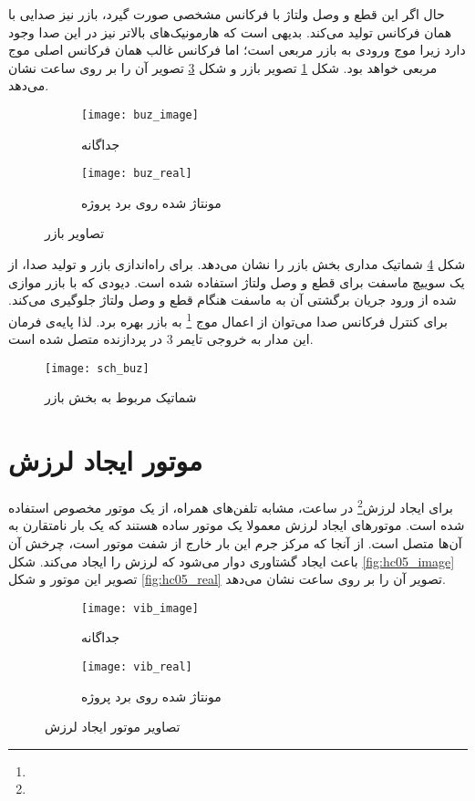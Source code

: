 حال اگر این قطع و وصل ولتاژ با فرکانس مشخصی صورت گیرد، بازر نیز صدایی با همان فرکانس تولید می‌کند. بدیهی است که هارمونیک‌های بالاتر نیز در این صدا وجود دارد زیرا موج ورودی به بازر مربعی است؛ اما فرکانس غالب همان فرکانس اصلی موج مربعی خواهد بود. شکل \ref{fig:buz_image} تصویر بازر و شکل \ref{fig:buz_real} تصویر آن را بر روی \pcbf ساعت نشان می‌دهد.

\begin{figure}[h]
	\centering
	\begin{subfigure}{0.45\textwidth}
		\centering
		\texttt{[image: buz\_image]}
		\caption{جداگانه}
		\label{fig:buz_image}
	\end{subfigure}
	\begin{subfigure}{0.4\textwidth}
		\centering
		\texttt{[image: buz\_real]}
		\caption{مونتاژ شده روی برد پروژه}
		\label{fig:buz_real}
	\end{subfigure}
	\caption{تصاویر بازر}
\end{figure}

شکل \ref{fig:sch-buz} شماتیک مداری بخش بازر را نشان می‌دهد. برای راه‌اندازی بازر و تولید صدا، از یک سوییچ ماسفت برای قطع و وصل ولتاژ استفاده شده است. دیودی که با بازر موازی شده از ورود جریان برگشتی آن به ماسفت هنگام قطع و وصل ولتاژ جلوگیری می‌کند. برای کنترل فرکانس صدا می‌توان از اعمال موج \footnote{} به بازر بهره برد. لذا پایه‌ی فرمان این مدار به خروجی  تایمر 3 در پردازنده متصل شده است.

\begin{figure}[h]
	\centering
	\texttt{[image: sch\_buz]}
	\caption{شماتیک مربوط به بخش بازر}
	\label{fig:sch-buz}
\end{figure}

\section{موتور ایجاد لرزش}
برای ایجاد لرزش\footnote{} در ساعت، مشابه تلفن‌های همراه، از یک موتور مخصوص استفاده شده است. موتورهای ایجاد لرزش معمولا یک موتور  ساده هستند که یک بار نامتقارن به آن‌ها متصل است. از آنجا که مرکز جرم این بار خارج از شفت موتور است، چرخش آن باعث ایجاد گشتاوری دوار می‌شود که لرزش را ایجاد می‌کند. شکل \ref{fig:hc05_image} تصویر این موتور و شکل \ref{fig:hc05_real} تصویر آن را بر روی \pcbf ساعت نشان می‌دهد.

\begin{figure}[h]
	\centering
	\begin{subfigure}{0.4\textwidth}
		\centering
		\texttt{[image: vib\_image]}
		\caption{جداگانه}
		\label{fig:vib_image}
	\end{subfigure}
	\begin{subfigure}{0.5\textwidth}
		\centering
		\texttt{[image: vib\_real]}
		\caption{مونتاژ شده روی برد پروژه}
		\label{fig:vib_real}
	\end{subfigure}
	\caption{تصاویر موتور ایجاد لرزش}
\end{figure}

